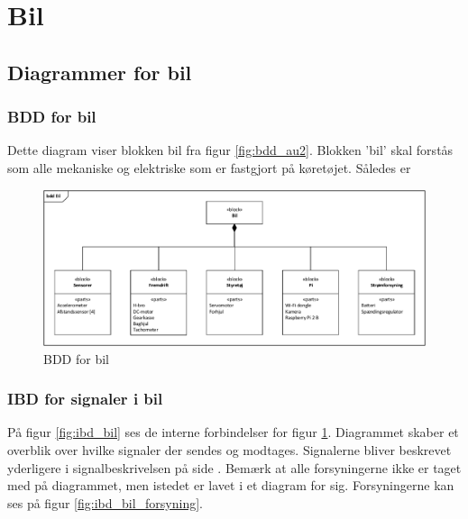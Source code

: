 \section{Bil}

\subsection{Diagrammer for bil}

\subsubsection{BDD for bil} %

Dette diagram viser blokken bil fra figur \ref{fig:bdd_au2}. Blokken 'bil' skal forstås som alle mekaniske og elektriske som er fastgjort på køretøjet. Således er 

\begin{figure}[h]
\centering
\includegraphics[width=\textwidth]{../fig/diagrammer/bil/bdd_bil.pdf}
\caption{BDD for bil}
\label{fig:bdd_bil}
\end{figure}
\clearpage

\subsubsection{IBD for signaler i bil}

På figur \ref{fig:ibd_bil} ses de interne forbindelser for figur \ref{fig:bdd_bil}. Diagrammet skaber et overblik over hvilke signaler der sendes og modtages. Signalerne bliver beskrevet yderligere i signalbeskrivelsen på side \pageref{sec:signalbeskrivelse}. Bemærk at alle forsyningerne ikke er taget med på diagrammet, men istedet er lavet i et diagram for sig. Forsyningerne kan ses på figur \ref{fig:ibd_bil_forsyning}.

